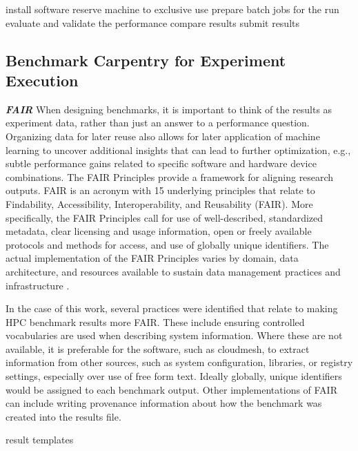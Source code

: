 \documentclass[utf8]{FrontiersinVancouver} %
\begin{document}
install software
reserve machine to exclusive use
prepare batch jobs for the run
evaluate and validate the performance
compare results
submit results




\subsection{Benchmark Carpentry for Experiment Execution}

\textbf{\textit{FAIR}}
When designing benchmarks, it is important to think of the results as experiment data, rather than just an answer to a performance question. Organizing data for later reuse also allows for later application of machine learning to uncover additional insights that can lead to further optimization, e.g., subtle performance gains related to specific software and hardware device combinations. The FAIR Principles provide a framework for aligning research outputs. FAIR is an acronym with 15 underlying principles that relate to Findability, Accessibility, Interoperability, and Reusability (FAIR)\citep{wilkinson2016fair}. More specifically, the FAIR Principles call for use of well-described, standardized metadata, clear licensing and usage information, open or freely available protocols and methods for access, and use of globally unique identifiers. The actual implementation of the FAIR Principles varies by domain, data architecture, and resources available to sustain data management practices and infrastructure \citep{jacobsen2020fair}.

In the case of this work, several practices were identified that relate to making HPC benchmark results more FAIR\citep{kirkpatrick2024}. These include ensuring controlled vocabularies are used when describing system information. Where these are not available, it is preferable for the software, such as cloudmesh, to extract information from other sources, such as system configuration, libraries, or registry settings, especially over use of free form text. Ideally globally, unique identifiers would be assigned to each benchmark output. Other implementations of FAIR can include writing provenance information about how the benchmark was created into the results file.

result templates


\end{document}
